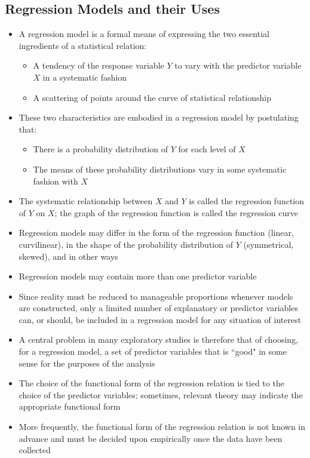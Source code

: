 \subsection{Regression Models and their Uses}
\begin{itemize}
\item A regression model is a formal means of expressing the two essential ingredients of a statistical relation: 
\begin{itemize}
\item A tendency of the response variable $Y$ to vary with the predictor variable $X$ in a systematic fashion
\item A scattering of points around the curve of statistical relationship
\end{itemize}
\item These two characteristics are embodied in a regression model by postulating that: \begin{itemize}
\item There is a probability distribution of $Y$ for each level of $X$ 
\item The means of these probability distributions vary in some systematic fashion with $X$ \end{itemize} 
\item The systematic relationship between $X$ and $Y$ is called the regression function of $Y$ on $X$; the graph of the regression function is called the regression curve 
\item Regression models may differ in the form of the regression function (linear, curvilinear), in the shape of the probability distribution of $Y$ (symmetrical, skewed), and in other ways 
\item Regression models may contain more than one predictor variable 
\item Since reality must be reduced to manageable proportions whenever models are constructed, only a limited number of explanatory or predictor variables can, or should, be included in a regression model for any situation of interest 
\item A central problem in many exploratory studies is therefore that of choosing, for a regression model, a set of predictor variables that is ``good" in some sense for the purposes of the analysis
\item The choice of the functional form of the regression relation is tied to the choice of the predictor variables; sometimes, relevant theory may indicate the appropriate functional form 
\item More frequently, the functional form of the regression relation is not known in advance and must be decided upon empirically once the data have been collected

\end{itemize}
